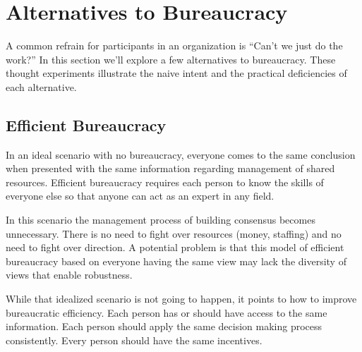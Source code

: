 \section{Alternatives to Bureaucracy \label{sec:alternatives-to-bureaucracy}}
A common refrain for participants in an organization is ``Can't we just do the work?'' In this section we'll explore a few alternatives to bureaucracy. These thought experiments illustrate the naive intent and the practical deficiencies of each alternative.



\subsection*{Efficient Bureaucracy}

In an ideal scenario with no bureaucracy, everyone comes to the same conclusion when presented with the same information regarding management of shared resources. Efficient bureaucracy requires each person to know the skills of everyone else so that anyone can act as an expert in any field. 

In this scenario the management process of building consensus becomes unnecessary. There is no need to fight over resources (money, staffing) and no need to fight over direction. A potential problem is that this model of efficient bureaucracy based on everyone having the same view may lack the diversity of views that enable robustness.


While that idealized scenario is not going to happen, it points to how to improve bureaucratic efficiency. Each person has or should have access to the same information. 
Each person should apply the same decision making process consistently.
Every person should have the same incentives.

